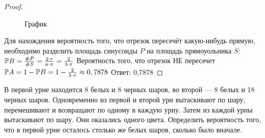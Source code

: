 \begin{proof}
\begin{figure}[H]
     \caption{График}
     \label{fig:enter-label}
 \end{figure}
 Для нахождения вероятность того, что отрезок пересечёт какую-нибудь прямую, необходимо разделить площадь синусоиды $P$ на площадь прямоуольника $S$:\newline
 $\mathbb{P}B = \frac{\#P}{\#S} = \frac{2 \cdot r}{a \cdot \pi} = \frac{2}{3 \cdot \pi}\newline$
 Вероятность того, что отрезок НЕ пересечет $\mathbb{P}A = 1 - \mathbb{P}B = 1 - \frac{2}{3 \cdot \pi} \approx 0,7878\newline$
 \newline
 Ответ: 0,7878
\end{proof}

\begin{problem}
	В первой урне находится 8 белых и 8 черных шаров, во второй --- 8 белых и 18 черных шаров. Одновременно из первой и второй урн вытаскивают по шару, перемешивают и возвращают по одному в каждую урну. Затем из каждой урны вытаскивают по шару. Они оказались одного цвета. Определить вероятность того, что в первой урне осталось столько же белых шаров, сколько было вначале.
\end{problem}

